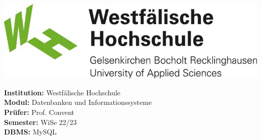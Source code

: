 \begin{titlepage}
    \clearpage
    \maketitle
    \vspace{2cm}
    \begin{center}
        \includegraphics[width=\paperwidth/2]{assets/img/whs}
    \end{center}
    \vspace*{\fill}
    \begin{flushleft}
        \Large{\textbf{Institution:} Westfälische Hochschule}\\
        \Large{\textbf{Modul:} Datenbanken und Informationssysteme} \\
        \Large{\textbf{Prüfer:} Prof. Convent}\\
        \Large{\textbf{Semester:} WiSe 22/23}\\
        \Large{\textbf{DBMS:} MySQL}
    \end{flushleft}
\end{titlepage}
